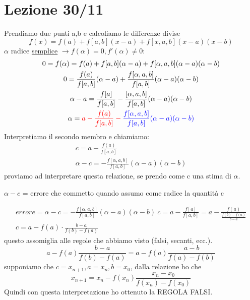 \documentclass[a4paper, portrait]{book}
\numberwithin{equation}{chapter} %
\begin{document}
\chapter{Lezione 30/11}
Prendiamo due punti a,b e calcoliamo le differenze divise
\begin{equation}
    f(x) = f(a) + f[a,b] (x-a) + f[x,a,b] (x-a) (x-b)
\end{equation}
$\alpha$ radice \underline{semplice} $\rightarrow f(\alpha) = 0, f'(\alpha) \neq 0$:
\begin{gather}
    0 = f(\alpha) = f(a) + f[a,b](\alpha - a) + f[\alpha,a,b](\alpha - a)(\alpha - b)\\
    0 = \frac{f(a)}{f[a,b]}(\alpha - a) + \frac{f[\alpha,a,b]}{f[a,b]}(\alpha - a)(\alpha - b)\\
    \alpha - a = \frac{f[a]}{f[a,b]} - \frac{[\alpha,a,b]}{f[a,b]}(\alpha - a)(\alpha - b)\\
    \alpha = \color{red}{a- \frac{f(a)}{f[a,b]}} - \color{blue}{\frac{f[\alpha,a,b]}{f[a,b]}(\alpha - a)(\alpha -b)}
\end{gather}
Interpretiamo il secondo membro e chiamiamo:
\begin{gather}
    c = a - \frac{f(a)}{f[a,b]}\\
    \alpha - c = - \frac{f[\alpha, a,b]}{f[a,b]}(\alpha - a)(\alpha -b)
\end{gather}
proviamo ad interpretare questa relazione, se prendo come c una stima di $\alpha$.\\
\begin{center}
    $\alpha - c$ = errore che commetto quando assumo come radice la quantità c
\end{center}
\begin{gather}
    errore = \alpha - c = - \frac{f[\alpha, a,b]}{f[a,b]}(\alpha - a)(\alpha - b)\
    c = a - \frac{f[a]}{f[a,b]} = a- \frac{f(a)}{\frac{f(b)-f(a)}{b-a}}\\
    c = a - f(a) \cdot \frac{b-a}{f(b) - f(a)}
\end{gather}
questo assomiglia alle regole che abbiamo visto (falsi, secanti, ecc.).
\begin{equation}
    a - f(a) \frac{b-a}{f(b) - f(a)} = a-f(a) \frac{a-b}{f(a)- f(b)}
\end{equation}
supponiamo che $c = x_{n+1}, a = x_n, b = x_0$, dalla relazione ho che
\begin{equation}
    x_{n+1} = x_n - f(x_n) \frac{x_n - x_0}{f(x_n)-f(x_0)}
\end{equation}
Quindi con questa interpretazione ho ottenuto la REGOLA FALSI.\\
\end{document}
